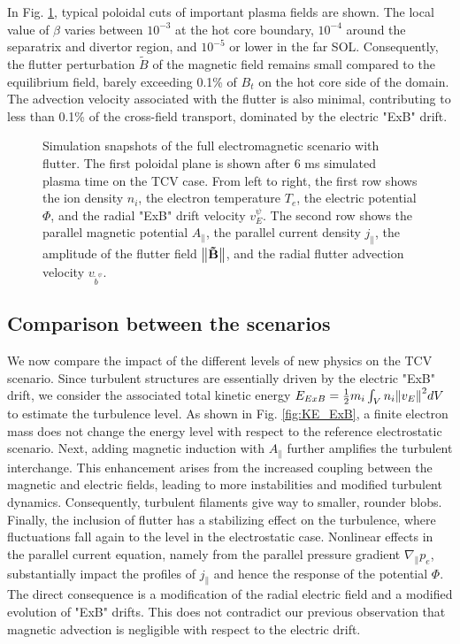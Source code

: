 In Fig. \ref{fig:EMsnapshots}, typical poloidal cuts of important plasma fields are shown. The local value of $\beta$ varies between $10^{-3}$ at the hot core boundary, $10^{-4}$ around the separatrix and divertor region, and $10^{-5}$ or lower in the far SOL. Consequently, the flutter perturbation $\tilde{B}$ of the magnetic field remains small compared to the equilibrium field, barely exceeding 0.1\% of $B_t$ on the hot core side of the domain. The advection velocity associated with the flutter is also minimal, contributing to less than 0.1\% of the cross-field transport, dominated by the electric "ExB" drift. \newline

\begin{figure}[H]\centering
	\centering
	\caption{Simulation snapshots of the full electromagnetic scenario with flutter. The first poloidal plane is shown after 6 ms simulated plasma time on the TCV case. From left to right, the first row shows the ion density $n_i$, the electron temperature $T_e$, the electric potential $\Phi$, and the radial "ExB" drift velocity $v_E^\psi$. The second row shows the parallel magnetic potential $A_\parallel$, the parallel current density $j_\parallel$, the amplitude of the flutter field $\norm{\mathbf{\tilde{B}}}$, and the radial flutter advection velocity $v_{\tilde{b}^\psi}$.}
	\label{fig:EMsnapshots}
\end{figure}




\subsection{Comparison between the scenarios}

We now compare the impact of the different levels of new physics on the TCV scenario. Since turbulent structures are essentially driven by the electric "ExB" drift, we consider the associated total kinetic energy $E_{ExB} = \frac{1}{2}m_i \int_V n_i \norm{v_E}^2 dV$ to estimate the turbulence level. As shown in Fig. \ref{fig:KE_ExB}, a finite electron mass does not change the energy level with respect to the reference electrostatic scenario. Next, adding magnetic induction with $A_\parallel$ further amplifies the turbulent interchange. This enhancement arises from the increased coupling between the magnetic and electric fields, leading to more instabilities and modified turbulent dynamics. Consequently, turbulent filaments give way to smaller, rounder blobs. Finally, the inclusion of flutter has a stabilizing effect on the turbulence, where fluctuations fall again to the level in the electrostatic case. Nonlinear effects in the parallel current equation, namely from the parallel pressure gradient $\nabla_\parallel p_e$, substantially impact the profiles of $j_\parallel$ and hence the response of the potential $\Phi$. The direct consequence is a modification of the radial electric field and a modified evolution of "ExB" drifts. This does not contradict our previous observation that magnetic advection is negligible with respect to the electric drift. \newline

